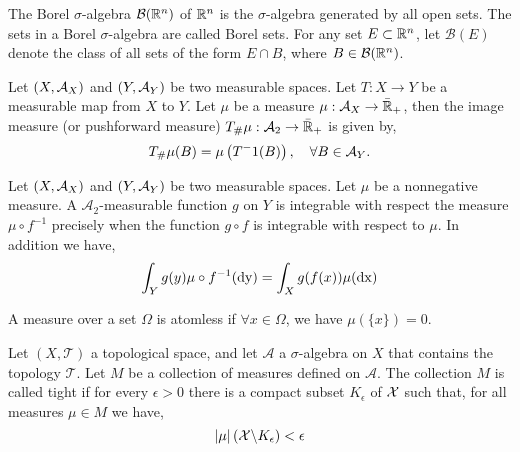 \begin{definition}
	
	The Borel $\sigma$-algebra $\mathcal{B}(\mathbb{R}^n)$ of $\mathbb{R}^n$ is the $\sigma$-algebra generated by all open sets. The sets in a Borel $\sigma$-algebra are called Borel sets. For any set $E\subset \mathbb{R}^n$, let $\mathcal B(E)$ denote the class of all sets of the form $E\cap B$, where $B\in\mathcal B(\mathbb{R}^n)$.
\end{definition}

\begin{definition}

\end{definition}

\begin{definition}
	Let $\left( X, \mathcal{A}_X \right)$  and $\left( Y, \mathcal{A}_Y \right)$ be two measurable spaces. Let $T:X\rightarrow Y$ be a measurable map from $X$ to $Y$. Let $\mu$ be a measure $\mu: \mathcal{A}_X\rightarrow \bar{\mathbb{R}}_+$, then the image measure (or pushforward measure) ${T}_{\#} \mu:\mathcal{A}_2\rightarrow \bar{\mathbb{R}}_+$ is given by,
	\begin{equation*}
		{T}_{\#} \mu(B) = \mu\left( T^-1(B) \right), \quad \forall B \in \mathcal{A}_Y.
	\end{equation*}
\end{definition}

\begin{theorem}
	Let $\left( X, \mathcal{A}_X \right)$  and $\left( Y, \mathcal{A}_Y \right)$ be two measurable spaces. Let $\mu$ be a nonnegative measure. A $\mathcal{A}_2$-measurable function $g$ on $Y$ is integrable with respect the measure $\mu\circ f^{-1}$ precisely when the function $g\circ f$ is integrable with respect to $\mu$. In addition we have, 
	\begin{equation*}
		\int_Y g(y)\mu\circ f^{-1}(\mathrm{dy}) = \int_X g(f(x))\mu(\mathrm{dx})
	\end{equation*}
\end{theorem}


\begin{definition}
	A measure over a set $\Omega$ is atomless if $\forall x \in \Omega$, we have  $\mu(\{x\})=0$.
\end{definition}


\begin{definition}[Tightness] Let $(X, \mathcal T)$ a topological space, and let $\mathcal A$ a $\sigma$-algebra on $X$ that contains the topology $\mathcal{T}$. Let $M$ be a collection of measures defined on $\mathcal{A}$. The collection $M$ is called tight  if for every $\epsilon>0$ there is a compact subset $K_\epsilon$  of $\mathcal{X}$ such that, for all measures $\mu\in M$ we have,
	\begin{equation*}
	\left| \mu \right|\left( \mathcal{X} \backslash K_\epsilon \right) < \epsilon
	\end{equation*} 
\end{definition}

